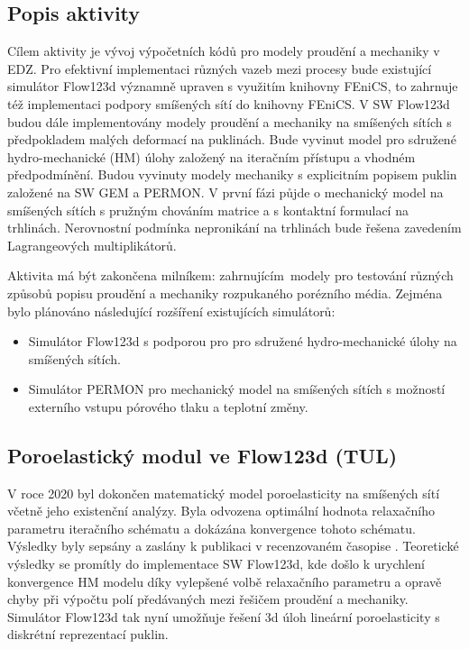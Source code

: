 \documentclass[11pt,a4paper]{article}
\begin{document}
\begin{onehalfspacing}
\subsection{Popis aktivity}
Cílem aktivity je vývoj výpočetních kódů pro modely proudění a mechaniky v EDZ. Pro efektivní implementaci různých vazeb mezi
procesy bude existující simulátor Flow123d významně upraven s využitím knihovny FEniCS, to zahrnuje též implementaci podpory
smíšených sítí do knihovny FEniCS. V SW Flow123d budou dále implementovány modely proudění a mechaniky na smíšených sítích s
předpokladem malých deformací na puklinách.
Bude vyvinut model pro sdružené hydro-mechanické (HM) úlohy založený na iteračním přístupu a vhodném předpodmínění.
Budou vyvinuty modely mechaniky s explicitním popisem puklin založené na SW GEM a PERMON. V první fázi půjde o mechanický
model na smíšených sítích s pružným chováním matrice a s kontaktní formulací na trhlinách. Nerovnostní podmínka nepronikání na
trhlinách bude řešena zavedením Lagrangeových multiplikátorů.

Aktivita má být zakončena milníkem:  zahrnujícím~modely pro testování různých způsobů popisu proudění a mechaniky rozpukaného porézního média. Zejména bylo plánováno následující rozšíření existujících simulátorů:
\begin{itemize}
\item Simulátor Flow123d s podporou pro pro sdružené hydro-mechanické úlohy na smíšených sítích.
\item Simulátor PERMON pro mechanický model na smíšených sítích s možností externího vstupu pórového tlaku a teplotní změny.
\end{itemize}

\subsection{Poroelastický modul ve Flow123d (TUL)}
V roce 2020 byl dokončen matematický model poroelasticity na smíšených sítí včetně jeho existenční analýzy.
Byla odvozena optimální hodnota relaxačního parametru iteračního schématu  a dokázána konvergence tohoto schématu.
Výsledky byly sepsány a zaslány k publikaci v recenzovaném časopise \cite{brezina_stebel_preprint}.
Teoretické výsledky se promítly do implementace SW Flow123d, kde došlo k urychlení konvergence HM modelu díky vylepšené 
volbě relaxačního parametru a opravě chyby při výpočtu polí předávaných mezi řešičem proudění a mechaniky.
Simulátor Flow123d tak nyní umožňuje řešení 3d úloh lineární poroelasticity s diskrétní reprezentací puklin.


\end{onehalfspacing}
\end{document}
